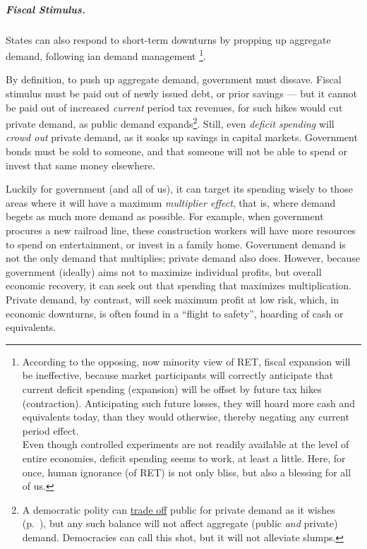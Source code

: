 \subparagraph{Fiscal Stimulus.}  \label{sec:fiscal-stimulus}
States can also respond to short-term downturns by propping up aggregate demand, following \citeauthor{Keynes1936}ian demand management \footnote{
	According to the opposing, now minority view of \gls{RET}, fiscal expansion will be ineffective, because market participants will correctly anticipate that current deficit spending (expansion) will be offset by future tax hikes (contraction). Anticipating such future losses, they will hoard more cash and equivalents today, than they would otherwise, thereby negating any current period effect.\\ Even though controlled experiments are not readily available at the level of entire economies, deficit spending seems to work, at least a little. Here, for once, human ignorance (of \gls{RET}) is not only bliss, but also a blessing for all of us.}.

By definition, to push up aggregate demand, government must dissave. Fiscal stimulus must be paid out of newly issued debt, or prior savings --- but it cannot be paid out of increased \emph{current} period tax revenues, for such hikes would cut private demand, as public demand expands\footnote{
	A democratic polity can \hyperref[sec:tradeoffs]{trade off} public for private demand as it wishes (p.~\pageref{sec:tradeoffs}), but any such balance will not affect aggregate (public \emph{and} private) demand. Democracies can call this shot, but it will not alleviate slumps.}. 
Still, even \emph{deficit spending} will \emph{crowd out} private demand, as it soaks up savings in capital markets. Government bonds must be sold to someone, and that someone will not be able to spend or invest that same money elsewhere.

Luckily for government (and all of us), it can target its spending wisely to those areas where it will have a maximum \emph{multiplier effect}, that is, where demand begets as much more demand as possible. For example, when government procures a new railroad line, these construction workers will have more resources to spend on entertainment, or invest in a family home. Government demand is not the only demand that multiplies; private demand also does. However, because government (ideally) aims not to maximize individual profits, but overall economic recovery, it can seek out that spending that maximizes multiplication. Private demand, by contrast, will seek maximum profit at low risk, which, in economic downturns, is often found in a ``flight to safety'', hoarding of cash or equivalents.

